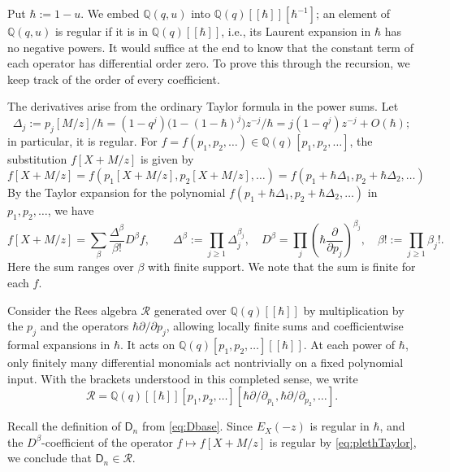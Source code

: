 \documentclass[12pt,reqno]{amsart}
\numberwithin{equation}{section}
\theoremstyle{definition}
\theoremstyle{remark}
\theoremstyle{plain}
\newcommand{\QQ}{\mathbb Q}
\newcommand{\Dop}{\mathsf D}
\begin{document}
Put $\hbar:=1-u$.  We embed $\QQ(q,u)$ into $\QQ(q)[[\hbar]][\hbar^{-1}]$; an element of $\QQ(q,u)$ is regular if it is in $\QQ(q)[[\hbar]]$, i.e., its Laurent expansion in $\hbar$ has no negative powers.  It would suffice at
the end to know that the constant term of each operator has
differential order zero.  To prove this through the recursion, we
keep track of the order of every coefficient.

The derivatives arise from the ordinary Taylor formula in the power
sums. Let 
\[
 \Delta_j:=p_j[M/z]/\hbar=(1-q^j)\bigl(1-(1-\hbar)^j\bigr)z^{-j}/\hbar
      =j(1-q^j)z^{-j}+O(\hbar);
\]
in particular, it is regular.
For $f=f(p_1,p_2,\dots)\in \QQ(q)[p_1,p_2,\dots]$, the substitution $f[X+M/z]$ is given by
\[ f[X+M/z] = f(p_1[X+M/z],p_2[X+M/z],\dots)=f(p_1+\hbar\Delta_1,p_2+\hbar\Delta_2,\dots)\]
By the Taylor expansion for the polynomial $f(p_1+\hbar\Delta_1,p_2+\hbar\Delta_2,\dots)$ in $p_1,p_2,\dots$, we have
\begin{equation}\label{eq:plethTaylor}
 f[X+M/z]=\sum_\beta\frac{\Delta^\beta}{\beta!}D^\beta f,
 \qquad
 \Delta^\beta:=\prod_{j\ge1}\Delta_j^{\beta_j},\quad D^\beta=\prod_j(\hbar\frac{\partial}{\partial p_j})^{\beta_j},\quad
 \beta!:=\prod_{j\ge1}\beta_j!.
\end{equation}
Here the sum ranges over $\beta$ with finite support. We note that the sum is finite for each $f$. 

Consider the Rees algebra $\mathscr R$ generated over
$\QQ(q)[[\hbar]]$ by multiplication by the $p_j$ and the operators
$\hbar\partial/\partial p_j$, allowing locally finite sums and
coefficientwise formal expansions in $\hbar$. It acts on
$\QQ(q)[p_1,p_2,\dots][[\hbar]]$. At each power of $\hbar$, only
finitely many differential monomials act nontrivially on a fixed
polynomial input. With the brackets understood in this completed
sense, we write
\begin{equation}\label{def:rees}
    \mathscr R=\QQ(q)[[\hbar]][p_1,p_2,\dots][\hbar \partial/\partial_{p_1},\hbar \partial/\partial_{p_2},\dots].
\end{equation}

Recall the definition of $\Dop_n$ from \eqref{eq:Dbase}. Since $E_X(-z)$ is regular in $\hbar$, and the $D^\beta$-coefficient of the operator $f\mapsto f[X+M/z]$ is regular by \eqref{eq:plethTaylor}, we conclude that $\Dop_n\in \mathscr R$.
\end{document}
